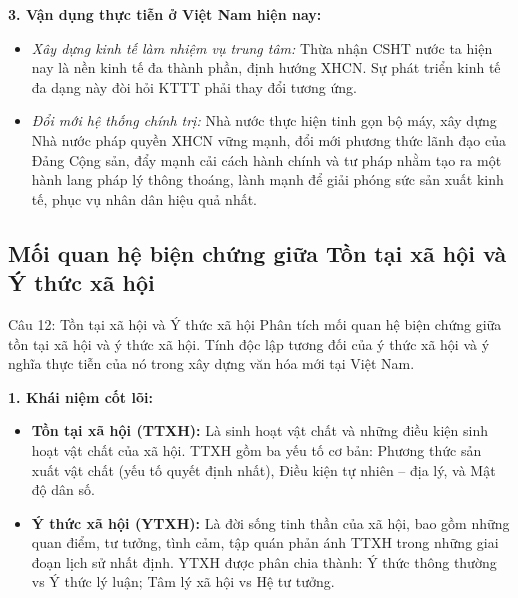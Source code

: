 \documentclass[12pt,a4paper]{article}
\begin{document}
{\noindent
\textbf{3. Vận dụng thực tiễn ở Việt Nam hiện nay:}
\begin{itemize}
    \item \textit{Xây dựng kinh tế làm nhiệm vụ trung tâm:} Thừa nhận CSHT nước ta hiện nay là nền kinh tế đa thành phần, định hướng XHCN. Sự phát triển kinh tế đa dạng này đòi hỏi KTTT phải thay đổi tương ứng.
    \item \textit{Đổi mới hệ thống chính trị:} Nhà nước thực hiện tinh gọn bộ máy, xây dựng Nhà nước pháp quyền XHCN vững mạnh, đổi mới phương thức lãnh đạo của Đảng Cộng sản, đẩy mạnh cải cách hành chính và tư pháp nhằm tạo ra một hành lang pháp lý thông thoáng, lành mạnh để giải phóng sức sản xuất kinh tế, phục vụ nhân dân hiệu quả nhất.
\end{itemize}

\subsection{Mối quan hệ biện chứng giữa Tồn tại xã hội và Ý thức xã hội}

\begin{questionbox}{Câu 12: Tồn tại xã hội và Ý thức xã hội}
Phân tích mối quan hệ biện chứng giữa tồn tại xã hội và ý thức xã hội. Tính độc lập tương đối của ý thức xã hội và ý nghĩa thực tiễn của nó trong xây dựng văn hóa mới tại Việt Nam.
\end{questionbox}

\noindent
\textbf{1. Khái niệm cốt lõi:}
\begin{itemize}
    \item \textbf{Tồn tại xã hội (TTXH):} Là sinh hoạt vật chất và những điều kiện sinh hoạt vật chất của xã hội. TTXH gồm ba yếu tố cơ bản: Phương thức sản xuất vật chất (yếu tố quyết định nhất), Điều kiện tự nhiên -- địa lý, và Mật độ dân số.
    \item \textbf{Ý thức xã hội (YTXH):} Là đời sống tinh thần của xã hội, bao gồm những quan điểm, tư tưởng, tình cảm, tập quán phản ánh TTXH trong những giai đoạn lịch sử nhất định. YTXH được phân chia thành: Ý thức thông thường vs Ý thức lý luận; Tâm lý xã hội vs Hệ tư tưởng.
\end{itemize}

}
\end{document}
